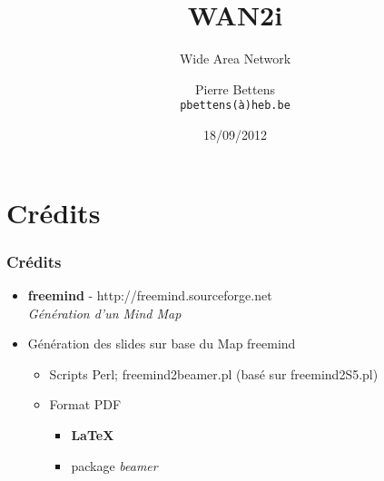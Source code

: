 \documentclass[a4paper,compress,13pt]{beamer}
\title{WAN2i}%
\subtitle{Wide Area Network}
\author[Pierre {\sc Bettens}]{Pierre {\sc Bettens} \\ \small \texttt{pbettens(\`a)heb.be}}
\institute{ÉSI - École Supérieure d'Informatique}
\date{18/09/2012}
\begin{document}
\begin{frame}[fragile]
	\titlepage
\end{frame}









\section{Crédits}

\begin{frame}[fragile]
  \frametitle{Crédits}
\begin{itemize}
	\item \textbf{freemind} - http://freemind.sourceforge.net  \\ 
	\textit{Génération d'un Mind Map}
	\item Génération des slides sur base du Map freemind 
	\begin{itemize}
		\item Scripts Perl; freemind2beamer.pl (basé sur freemind2S5.pl)
		\item Format PDF
		\begin{itemize}
			\item \textbf{ \LaTeX }
			\item package \textit{beamer} 
		\end{itemize}
	\end{itemize}
\end{itemize}
\end{frame}
\end{document}
